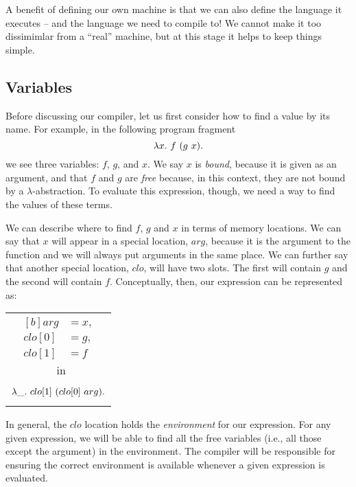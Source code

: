 \documentclass[12pt]{report}
\begin{document}
A benefit of defining our own machine is that we can also define the
language it executes -- and the language we need to compile to! We
cannot make it too dissimimlar from a ``real'' machine, but at this
stage it helps to keep things simple. 

\subsection{Variables}

Before discussing our compiler, let us first consider how to find
a value by its name. For example, in the following program fragment
\begin{equation}
  \lambda x.\ f\ (g\ x).
  \label{eq_lang1}
\end{equation}
we see three variables: $f$, $g$, and $x$. We say $x$ is \emph{bound},
because it is given as an argument, and that $f$ and $g$ are
\emph{free} because, in this context, they are not bound by a
$\lambda$-abstraction. To evaluate this expression, though, we need
a way to find the values of these terms.  

We can describe where to find $f$, $g$ and $x$ in terms of memory
locations. We can say that $x$ will appear in a special location,
$arg$, because it is the argument to the function and we will always
put arguments in the same place. We can further say that another
special location, $clo$, will have two
slots. The first will contain $g$ and the second will contain
$f$. Conceptually, then, our expression can be represented as:

\begin{center}
  \begin{tabular}{c}
    \begin{equation*}
      \begin{aligned}[b]
        arg &= x, \\
        clo[0] &= g, \\
        clo[1] &= f 
      \end{aligned}
    \end{equation*}\ in \\
    \begin{equation*}
      \lambda\_.\ clo[1]\ (clo[0]\ arg).
    \end{equation*}
  \end{tabular}
\end{center}
\bigskip
In general, the $clo$ location holds the \emph{environment} for our
expression. For any given expression, we will be able to find all the
free variables (i.e., all those except the argument) in the
environment. The compiler will be responsible for ensuring the correct
environment is available whenever a given expression is evaluated.
\end{document}
